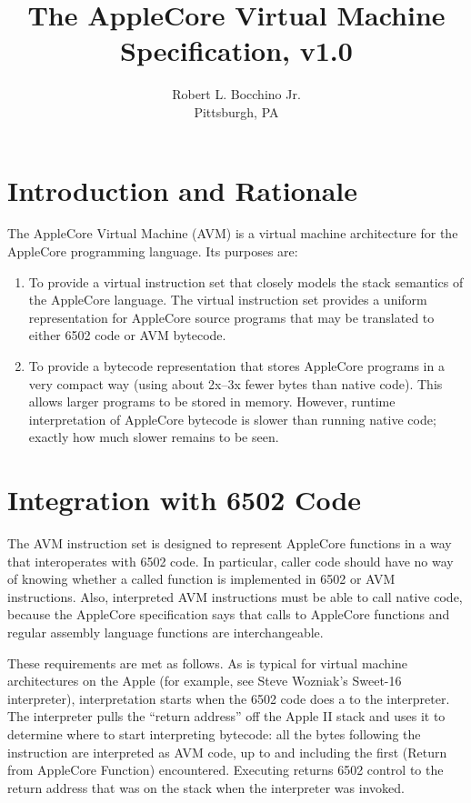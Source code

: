 \documentclass[10pt]{article}
\begin{document}
\title{\bfseries{The AppleCore Virtual Machine Specification, v1.0}}
%
\author{Robert L. Bocchino Jr.\\
Pittsburgh, PA}

\maketitle

\section{Introduction and Rationale}

The AppleCore Virtual Machine (AVM) is a virtual machine architecture
for the AppleCore programming language.  Its purposes are:
%
\begin{enumerate}
%
\item To provide a virtual instruction set that closely models the
  stack semantics of the AppleCore language.  The virtual instruction
  set provides a uniform representation for AppleCore source programs
  that may be translated to either 6502 code or AVM bytecode.
%
\item To provide a bytecode representation that stores AppleCore
  programs in a very compact way (using about 2x--3x fewer bytes than
  native code).  This allows larger programs to be stored in memory.
  However, runtime interpretation of AppleCore bytecode is slower than
  running native code; exactly how much slower remains to be seen.
%
\end{enumerate}

\section{Integration with 6502 Code}

The AVM instruction set is designed to represent AppleCore functions
in a way that interoperates with 6502 code.  In particular, caller
code should have no way of knowing whether a called function is
implemented in 6502 or AVM instructions.  Also, interpreted AVM
instructions must be able to call native code, because the AppleCore
specification says that calls to AppleCore functions and regular
assembly language functions are interchangeable.

These requirements are met as follows.  As is typical for virtual machine
architectures on the Apple (for example, see Steve Wozniak's Sweet-16
interpreter), interpretation starts when the 6502 code does a
 to the interpreter.  The interpreter pulls the ``return
address'' off the Apple II stack and uses it to determine where to start
interpreting bytecode: all the bytes following the 
instruction are interpreted as AVM code, up to and including the first
 (Return from AppleCore Function) encountered.
Executing  returns 6502 control to the return
address that was on the stack when the interpreter was
invoked.
\end{document}
